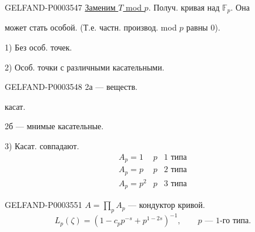 \begin{GelfandAdjacentEvidence}{GELFAND-P000354}{7}
\uline{Заменим $T$ mod $p$}. Получ. кривая над $\mathbb F_p$. Она
\end{GelfandAdjacentEvidence}

может стать особой.
(Т.е. частн. производ. mod $p$ равны $0$).

1) Без особ. точек.

2) Особ. точки с различными касательными.

\begin{GelfandAdjacentEvidence}{GELFAND-P000354}{8}
2а --- веществ.
\end{GelfandAdjacentEvidence}

касат.

2б --- мнимые касательные.

3) Касат. совпадают.
\begin{equation*}\begin{array}{lll}A_p=1&p&\text{1 типа}\\A_p=p&p&\text{2 типа}\\A_p=p^2&p&\text{3 типа}\end{array}\end{equation*}


\begin{GelfandAdjacentEvidence}{GELFAND-P000355}{1}
$A=\prod_p A_p$ --- кондуктор кривой.
\begin{equation*}L_p(\zeta)=(1-c_pp^{-s}+p^{1-2s})^{-1},\qquad p\text{ --- 1-го типа.}\end{equation*}
\end{GelfandAdjacentEvidence}


